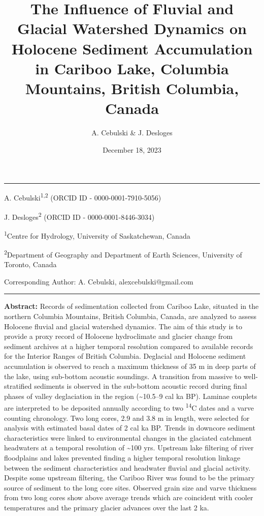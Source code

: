 \documentclass[
  letterpaper,
  DIV=11,
  numbers=noendperiod]{scrartcl}
\title{The Influence of Fluvial and Glacial Watershed Dynamics on
Holocene Sediment Accumulation in Cariboo Lake, Columbia Mountains,
British Columbia, Canada}
\author{A. Cebulski \& J. Desloges}
\date{December 18, 2023}
\begin{document}
\maketitle
\ifdefined\Shaded\renewenvironment{Shaded}{\begin{tcolorbox}[interior hidden, boxrule=0pt, frame hidden, sharp corners, borderline west={3pt}{0pt}{shadecolor}, enhanced, breakable]}{\end{tcolorbox}}\fi

\begin{center}\rule{0.5\linewidth}{0.5pt}\end{center}

A. Cebulski\textsuperscript{1,2} (ORCID ID - 0000-0001-7910-5056)

J. Desloges\textsuperscript{2} (ORCID ID - 0000-0001-8446-3034)

\textsuperscript{1}Centre for Hydrology, University of Saskatchewan,
Canada

\textsuperscript{2}Department of Geography and Department of Earth
Sciences, University of Toronto, Canada

Corresponding Author: A. Cebulski, alexcebulski@gmail.com

\begin{center}\rule{0.5\linewidth}{0.5pt}\end{center}

\pagebreak

\textbf{Abstract:} Records of sedimentation collected from Cariboo Lake,
situated in the northern Columbia Mountains, British Columbia, Canada,
are analyzed to assess Holocene fluvial and glacial watershed dynamics.
The aim of this study is to provide a proxy record of Holocene
hydroclimate and glacier change from sediment archives at a higher
temporal resolution compared to available records for the Interior
Ranges of British Columbia. Deglacial and Holocene sediment accumulation
is observed to reach a maximum thickness of 35 m in deep parts of the
lake, using sub-bottom acoustic soundings. A transition from massive to
well-stratified sediments is observed in the sub-bottom acoustic record
during final phases of valley deglaciation in the region
(\textasciitilde10.5--9 cal ka BP). Laminae couplets are interpreted to
be deposited annually according to two \textsuperscript{14}C dates and a
varve counting chronology. Two long cores, 2.9 and 3.8 m in length, were
selected for analysis with estimated basal dates of 2 cal ka BP. Trends
in downcore sediment characteristics were linked to environmental
changes in the glaciated catchment headwaters at a temporal resolution
of \textasciitilde100 yrs. Upstream lake filtering of river floodplains
and lakes prevented finding a higher temporal resolution linkage between
the sediment characteristics and headwater fluvial and glacial activity.
Despite some upstream filtering, the Cariboo River was found to be the
primary source of sediment to the long core sites. Observed grain size
and varve thickness from two long cores show above average trends which
are coincident with cooler temperatures and the primary glacier advances
over the last 2 ka.
\end{document}

